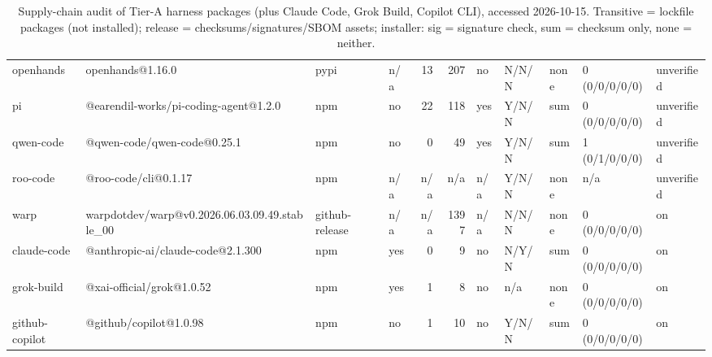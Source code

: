 \begin{table}[t]
{\begin{tabular}{llllrrlllll}
openhands & openhands@1.16.0 & pypi & n/a & 13 & 207 & no & N/N/N & none & 0 (0/0/0/0/0) & unverified \\
pi & @earendil-works/pi-coding-agent@1.2.0 & npm & no & 22 & 118 & yes & Y/N/N & sum & 0 (0/0/0/0/0) & unverified \\
qwen-code & @qwen-code/qwen-code@0.25.1 & npm & no & 0 & 49 & yes & Y/N/N & sum & 1 (0/1/0/0/0) & unverified \\
roo-code & @roo-code/cli@0.1.17 & npm & n/a & n/a & n/a & n/a & Y/N/N & none & n/a & unverified \\
warp & warpdotdev/warp@v0.2026.06.03.09.49.stable\_00 & github-release & n/a & n/a & 1397 & n/a & N/N/N & none & 0 (0/0/0/0/0) & on \\
claude-code & @anthropic-ai/claude-code@2.1.300 & npm & yes & 0 & 9 & no & N/Y/N & sum & 0 (0/0/0/0/0) & on \\
grok-build & @xai-official/grok@1.0.52 & npm & yes & 1 & 8 & no & n/a & none & 0 (0/0/0/0/0) & on \\
github-copilot & @github/copilot@1.0.98 & npm & no & 1 & 10 & no & Y/N/N & sum & 0 (0/0/0/0/0) & on \\
\bottomrule
\end{tabular}}
\caption{Supply-chain audit of Tier-A harness packages (plus Claude Code, Grok Build, Copilot CLI), accessed 2026-10-15. Transitive = lockfile packages (not installed); release = checksums/signatures/SBOM assets; installer: sig = signature check, sum = checksum only, none = neither.}
\label{tab:e4-supply}
\end{table}
